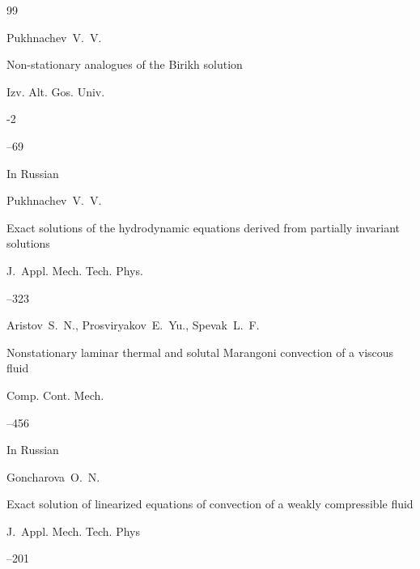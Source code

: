 \begin{thebibliography}{99}

\by Pukhnachev~V.~V.

\paper Non-stationary analogues of the Birikh solution

\jour Izv. Alt. Gos. Univ.


-2

--69

\lang In Russian





\by Pukhnachev~V.~V.

\paper Exact solutions of the hydrodynamic equations derived from partially invariant solutions

\jour J.~Appl. Mech. Tech. Phys.




--323





\by Aristov~S.~N., Prosviryakov~E.~Yu., Spevak~L.~F.

\paper Nonstationary laminar thermal and solutal Marangoni convection of a viscous fluid

\jour Comp. Cont. Mech.




–456

\lang In Russian





\by Goncharova~O.~N.

\paper Exact solution of linearized equations of convection of a weakly compressible fluid

\jour J.~Appl. Mech. Tech. Phys




--201





\end{thebibliography}
